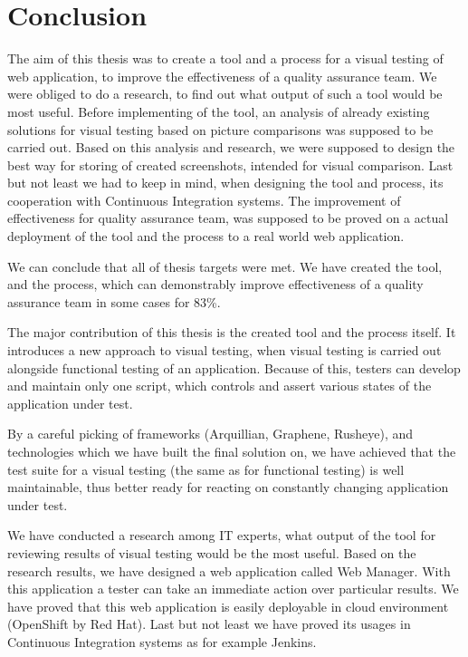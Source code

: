 \documentclass[11pt,oneside,final]{fithesis2}
\begin{document}
\label{sec:plannedExtensions}
  
\chapter{Conclusion}
The aim of this thesis was to create a tool and a process for a visual testing of web application, to improve the effectiveness of a 
quality assurance team. We were obliged to do a research, to find out what output of such a tool would be most useful. Before implementing
of the tool, an analysis of already existing solutions for visual testing based on picture comparisons was supposed to be carried out.
Based on this analysis and research, we were supposed to design the best way for storing of created screenshots, intended for visual comparison.
Last but not least we had to keep in mind, when designing the tool and process, its cooperation with Continuous Integration systems.
The improvement of effectiveness for quality assurance team, was supposed to be proved on a actual deployment of the tool and the 
process to a real world web application.

We can conclude that all of thesis targets were met. We have created the tool, and the process, which can demonstrably improve effectiveness
of a quality assurance team in some cases for 83\%.

The major contribution of this thesis is the created tool and the process itself. It introduces a new approach to visual testing, when
visual testing is carried out alongside functional testing of an application. Because of this, testers can develop and maintain only one
script, which controls and assert various states of the application under test.

By a careful picking of frameworks (Arquillian, Graphene, Rusheye), and technologies which we have built the final solution on, we have 
achieved that the test suite for a visual testing (the same as for functional testing) is well maintainable, thus better ready for reacting 
on constantly changing application under test.

We have conducted a research among IT experts, what output of the tool for reviewing results of visual testing would be the most useful. Based
on the research results, we have designed a web application called Web Manager. With this application a tester can take an immediate action
over particular results. We have proved that this web application is easily deployable in cloud environment (OpenShift by Red Hat). Last but
not least we have proved its usages in Continuous Integration systems as for example Jenkins.
\end{document}
